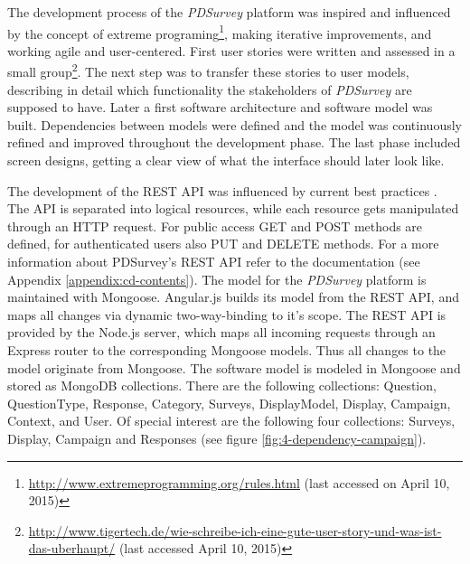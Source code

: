 	The development process of the \textit{PDSurvey} platform was inspired and influenced by the concept of extreme programing\footnote{\url{http://www.extremeprogramming.org/rules.html} (last accessed on April 10, 2015)}, making iterative improvements, and working agile and user-centered. First user stories were written and assessed in a small group\footnote{\url{http://www.tigertech.de/wie-schreibe-ich-eine-gute-user-story-und-was-ist-das-uberhaupt/} (last accessed April 10, 2015)}. The next step was to transfer these stories to user models, describing in detail which functionality the stakeholders of \textit{PDSurvey} are supposed to have. Later a first software architecture and software model was built. Dependencies between models were defined and the model was continuously refined and improved throughout the development phase. The last phase included screen designs, getting a clear view of what the interface should later look like.

	The development of the REST API was influenced by current best practices \cite{Sahni2015RESTAPI, TutsPlus2015RESTAPI, hughes2012einfuhrung}. The API is separated into logical resources, while each resource gets manipulated through an HTTP request. For public access GET and POST methods are defined, for authenticated users also PUT and DELETE methods. For a more information about PDSurvey's REST API refer to the documentation (see Appendix \ref{appendix:cd-contents}).
	The model for the \textit{PDSurvey} platform is maintained with Mongoose. Angular.js builds its model from the REST API, and maps all changes via dynamic two-way-binding to it's scope. The REST API is provided by the Node.js server, which maps all incoming requests through an Express router to the corresponding Mongoose models. Thus all changes to the model originate from Mongoose.
	The software model is modeled in Mongoose and stored as MongoDB collections. There are the following collections: Question, QuestionType, Response, Category, Surveys, DisplayModel, Display, Campaign, Context, and User. 
	Of special interest are the following four collections: Surveys, Display, Campaign and Responses (see figure \ref{fig:4-dependency-campaign}).




